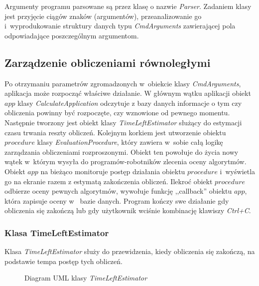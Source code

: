 \documentclass[../thesis.tex]{subfiles}
\begin{document}
Argumenty programu parsowane są przez klasę o nazwie \emph{Parser}. Zadaniem klasy jest przyjęcie ciągów znaków (argumentów), przeanalizowanie go i~wyprodukowanie struktury danych typu \emph{CmdArguments} zawierającej pola odpowiadające poszczególnym argumentom.

\subsection{Zarządzenie obliczeniami równoległymi}

Po otrzymaniu parametrów zgromadzonych w~obiekcie klasy \emph{CmdArguments}, aplikacja może rozpocząć właściwe działanie. W głównym wątku aplikacji obiekt $app$ klasy \emph{CalculateApplication} odczytuje z bazy danych informacje o tym czy obliczenia powinny być rozpoczęte, czy wznowione od pewnego momentu. Następnie tworzony jest obiekt klasy \emph{TimeLeftEstimator} służący do estymacji czasu trwania reszty obliczeń. Kolejnym korkiem jest utworzenie obiektu $procedure$ klasy \emph{EvaluationProcedure}, który zawiera w~sobie całą logikę zarządzania obliczeniami rozproszonymi. Obiekt ten powołuje do życia nowy wątek w~którym wysyła do programów-robotników zlecenia oceny algorytmów. Obiekt $app$ na bieżąco monitoruje postęp działania obiektu $procedure$ i~wyświetla go na ekranie razem z estymatą zakończenia obliczeń. Ilekroć obiekt $procedure$ odbierze oceny pewnych algorytmów, wywołuje funkcję ,,callback'' obiektu $app$, która zapisuje oceny w~ bazie danych. Program kończy swe działanie gdy obliczenia się zakończą lub gdy użytkownik wciśnie kombinację klawiszy \emph{Ctrl+C}. 

\subsubsection{Klasa TimeLeftEstimator}

Klasa \emph{TimeLeftEstimator} służy do przewidzenia, kiedy obliczenia się zakończą, na podstawie tempa postęp tych obliczeń.

\begin{figure}[h]
\centering
{}
\caption{Diagram UML klasy \emph{TimeLeftEstimator}}
\label{proj:diagram_time_left_est}
\end{figure}
\end{document}
